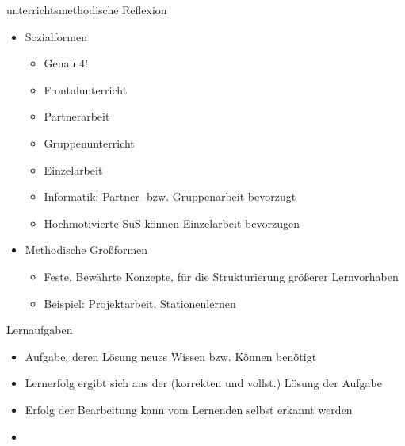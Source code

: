 \documentclass{article}
\begin{document}
\begin{block}{unterrichtsmethodische Reflexion}
\begin{itemize}
        \item Sozialformen
        \begin{itemize}
            \item Genau 4!
            \item Frontalunterricht
            \item Partnerarbeit
            \item Gruppenunterricht
            \item Einzelarbeit
            \item Informatik: Partner- bzw. Gruppenarbeit bevorzugt
            \item Hochmotivierte SuS können Einzelarbeit bevorzugen
        \end{itemize}
        \item Methodische Großformen
        \begin{itemize}
            \item Feste, Bewährte Konzepte, für die Strukturierung größerer Lernvorhaben
            \item Beispiel: Projektarbeit, Stationenlernen
        \end{itemize}
    \end{itemize}
\end{block}

\begin{block}{Lernaufgaben}
    \begin{itemize}
        \item Aufgabe, deren Lösung neues Wissen bzw. Können benötigt
        \item Lernerfolg ergibt sich aus der (korrekten und vollst.) Lösung der Aufgabe
        \item Erfolg der Bearbeitung kann vom Lernenden selbst erkannt werden
        \item 
    \end{itemize}
\end{block}
\end{document}
